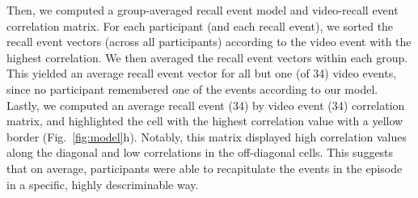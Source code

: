 \documentclass{article}
\begin{document}
{Then, we computed a group-averaged recall event model and video-recall event correlation matrix. For each participant (and each recall event), we sorted the recall event vectors (across all participants) according to the video event with the highest correlation. We then averaged the recall event vectors within each group. This yielded an average recall event vector for all but one (of 34) video events, since no participant remembered one of the events according to our model. Lastly, we computed an average recall event (34) by video event (34) correlation matrix, and highlighted the cell with the highest correlation value with a yellow border (Fig.~\ref{fig:model}h). Notably, this matrix displayed high correlation values along the diagonal and low correlations in the off-diagonal cells. This suggests that on average, participants were able to recapitulate the events in the episode in a specific, highly descriminable way.

}
\end{document}
